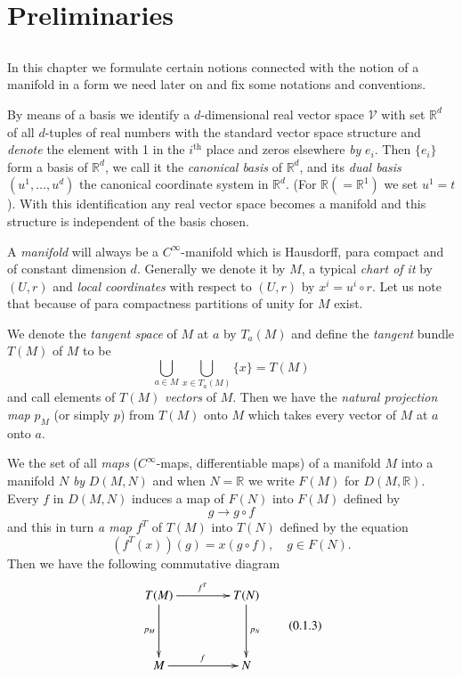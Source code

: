\setcounter{chapter}{-1}
\chapter{Preliminaries}\label{chap0:chap0}\pageoriginale

\section{}\label{chap0:sec1}
In this chapter we formulate certain notions connected with the notion
of a manifold in a form we need later on and fix some notations and
conventions.

By means of a basis we identify a $d$-dimensional real vector space
$\mathcal{V}$ with set $\mathbb{R}^{d}$ of all $d$-tuples of real
numbers with the standard vector space structure and {\em denote} the
element with 1 in the $i^{\text{th}}$ place and zeros elsewhere {\em
  by} $e_{i}$. Then $\{e_{i}\}$ form a basis of $\mathbb{R}^{d}$, we
call it the {\em canonical basis} of $\mathbb{R}^{d}$, and its {\em
  dual basis} $(u^{1},\ldots,u^{d})$ the canonical coordinate system
in $\mathbb{R}^{d}$. (For $\mathbb{R}(=\mathbb{R}^{1})$ we set
$u^{1}=t$). With this identification any real vector space becomes a
manifold and this structure is independent of the basis chosen.

A {\em manifold} will always be a $C^{\infty}$-manifold which is
Hausdorff, para compact and of constant dimension $d$. Generally we
denote it by $M$, a typical {\em chart of it} by $(U,r)$ and {\em
  local coordinates} with respect to $(U,r)$ by $x^{i}=u^{i}\circ
r$. Let us note that because of para compactness partitions of unity
for $M$ exist.

We denote the {\em tangent space} of $M$ at $a$ by $T_{a}(M)$ and
define the {\em tangent} bundle $T(M)$ of $M$ to be
\begin{equation*}\label{chap0:0.1.1}
\bigcup_{a\in M} \bigcup_{x\in T_{a}(M)}\{x\}=T(M)\tag{0.1.1}
\end{equation*}
and call elements of $T(M)$ {\em vectors} of $M$. Then we have the
{\em natural projection map} $p_{M}$ (or simply $p$) from $T(M)$ onto
$M$ which takes every vector of $M$ at $a$ onto $a$.

We  the set of all {\em maps} ($C^{\infty}$-maps,
differentiable maps) of a manifold $M$ into a manifold $N$ {\em by}
$D(M,N)$ and when $N=\mathbb{R}$ we write $F(M)$ for
$D(M,\mathbb{R})$. Every $f$ in $D(M,N)$ induces a map of $F(N)$ into
$F(M)$ defined by
$$
g\to g\circ f
$$
and this in turn {\em a map} $f^{T}$ of $T(M)$ into $T(N)$ defined by
the equation
\begin{equation*}\label{chap0:0.1.2}
(f^{T}(x))(g)=x(g\circ f),\quad g\in F(N).\tag{0.1.2}
\end{equation*}
Then we have the following commutative diagram
\[\label{chap0:0.1.3}
\vcenter{\xymatrix@=1.5cm{
T(M)\ar[r]^{f^{T}}\ar[d]_{p_{M}} & T(N)\ar[d]^{p_{N}}\\
M\ar[r]^{f} & N
}}\tag{0.1.3}
\]

